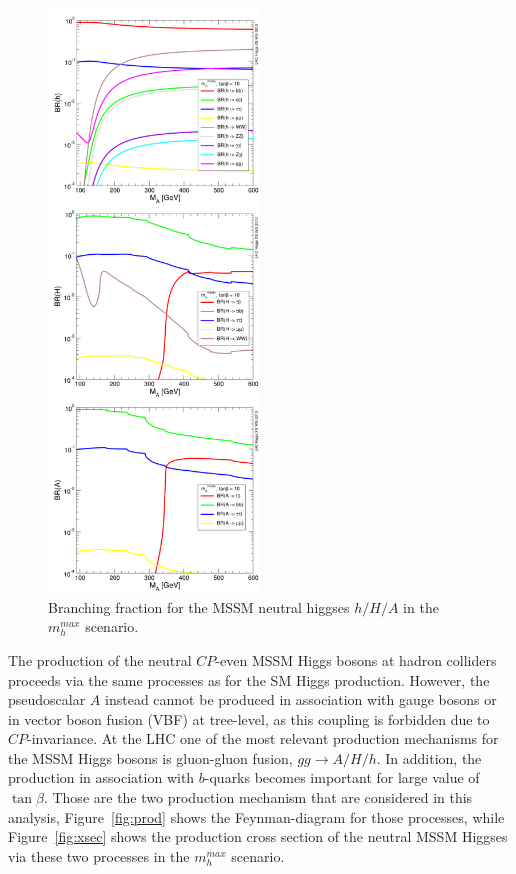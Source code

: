 \begin{figure}[tp]
     \begin{center}

            \includegraphics[width=0.5\textwidth]{figure/br.png}

    \end{center}
    \caption{Branching fraction for the MSSM neutral higgses $h/H/A$ in the $m_h^{max}$ scenario.}
   \label{fig:br}

\end{figure}

The production of the neutral $CP$-even MSSM Higgs bosons at hadron
colliders proceeds via the same processes as for the SM Higgs
production. However, the pseudoscalar $A$ instead cannot be produced
in association with gauge bosons or in vector boson fusion (VBF) at
tree-level, as this coupling is forbidden due to $CP$-invariance.  At
the LHC one of the most relevant production mechanisms for the MSSM
Higgs bosons is gluon-gluon fusion, $gg\rightarrow A/H/h$. In
addition, the production in association with $b$-quarks becomes
important for large value of $\tan\beta$. Those are the two production mechanism
that are considered in this analysis, Figure~\ref{fig:prod} shows the Feynman-diagram
for those processes, while Figure~\ref{fig:xsec} shows the production cross section of the neutral 
MSSM Higgses via these two processes in the $m_h^{max}$ scenario.


